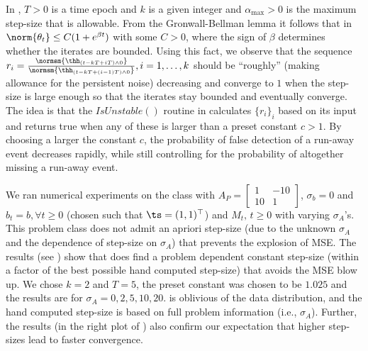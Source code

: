 In , $T>0$ is a time epoch and $k$ is a given integer and $\alpha_{\max}>0$ is the maximum step-size that is allowable. From the Gronwall-Bellman lemma it follows that in  $\norm{\theta_t}\leq C(1+e^{\beta t})$ with some $C>0$, where the sign of $\beta$ determines whether the iterates are bounded. 
Using this fact, we observe that the sequence $r_i=\frac{\normsm{\thh_{(t-kT+iT)\wedge 0}}}{\normsm{\thh_{(t-kT+(i-1)T)\wedge 0}}},i=1,\ldots,k$ should be ``roughly'' (making allowance for the persistent noise) decreasing and converge to $1$ when the step-size is large enough so that the iterates stay bounded and eventually converge. 
The idea is that the $IsUnstable()$ routine in  calculates $\{r_i\}_i$ based on its input and returns true when any of these is larger than a preset constant $c>1$. By choosing a larger the constant $c$, the probability of false detection of a run-away event decreases rapidly, while still controlling for the probability of altogether missing a run-away event.\par
We ran numerical experiments on the class with $A_{P}=\begin{bmatrix} 1 &-10\\ 10 &1\end{bmatrix}$, $\sigma_b=0$ and $b_t=b,\forall t\geq 0$ (chosen such that $\ts=(1,1)^\top$) and $M_t,\,t \geq 0$ with varying $\sigma_A$'s. This problem class does not admit an apriori step-size (due to the unknown $\sigma_A$ and the dependence of step-size on $\sigma_A$) that prevents the explosion of MSE.
The results (see ) show that  does find a problem dependent constant step-size  (within a factor of the best possible hand computed step-size) that avoids the MSE blow up. We chose $k=2$ and $T=5$, the preset constant was chosen to be $1.025$ and the results are for $\sigma_A=0,2,5,10,20$.
 is oblivious of the data distribution, and the hand computed step-size is based on full problem information (i.e., $\sigma_A$).
 Further, the results (in the right plot of ) also confirm our expectation that higher step-sizes lead to faster convergence.


